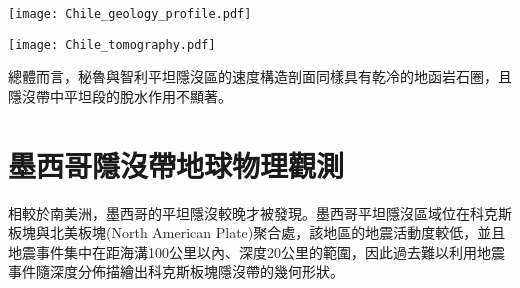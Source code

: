 \begin{figure*}[ht!]
    \centering
    \texttt{[image: Chile\_geology\_profile.pdf]}
    \caption[智利中部和阿根廷西部的地質構造與地震活動度背景圖，摘自\citet{Marot2014}]{智利中部和阿根廷西部的地質構造與地震活動度背景圖，摘自\citet{Marot2014}。(a)納茲卡板塊隱沒進入南美板塊的海溝由帶三角形的黑線標出。臨時地震網以倒三角形表示，地震分佈由灰點標出，紅色正三角形為活火山分佈，隱沒板塊等深度線資料來自\citet{anderson2007geometry}。白線為智利與阿根廷的國界，白色圈圈為主要城市，其中黑色星星為智利首都聖地牙哥(Santiago)。灰線與灰透明底為推斷的胡安斐南德斯洋脊隱沒路徑與寬度，插圖為宏觀地圖，兩條黑色虛線為該研究中所觀測的剖面，分別為南緯31.5度(平坦隱沒區)與南緯33.5度(正常隱沒區)。(b)粗黑線標示主要地質縫合帶，帶三角形的黑細線為La Ramada與Aconcagua斷層，白色圈圈為主要城市，紅色正三角形為活火山分佈。(c)(d)為圖(a)中的剖面，黑色點顯示平坦板塊與正常板塊區域的地震活動，倒黑色三角形是海溝位置，紅色三角形是活火山。
    }
    \label{fig::Chile_geology_profile}
\end{figure*}

\begin{figure*}[ht!]
    \centering
    \texttt{[image: Chile\_tomography.pdf]}
    \caption[智利中部和阿根廷西部的熱模型與速度構造剖面，摘自\citet{Marot2014}]{智利中部和阿根廷西部的熱模型與速度構造剖面，摘自\citet{Marot2014}。由上至下為熱構造剖面、V$_P$速度變化、V$_S$速度變化與V$_P$/V$_S$比值，速度構造剖面中的等高線為絕對地震速度。紅點代表該研究地震層析成像所選用的地震事件。白線為莫荷面，灰線為隱沒板塊頂部。(a)為圖\ref{fig::Chile_geology_profile}a中的C剖面。(b)為圖\ref{fig::Chile_geology_profile}a中的D剖面。
    }
    \label{fig::Chile_tomography}
\end{figure*}

總體而言，秘魯與智利平坦隱沒區的速度構造剖面同樣具有乾冷的地函岩石圈，且隱沒帶中平坦段的脫水作用不顯著。

\section{墨西哥隱沒帶地球物理觀測}\label{墨西哥隱沒帶地球物理觀測}
相較於南美洲，墨西哥的平坦隱沒較晚才被發現。墨西哥平坦隱沒區域位在科克斯板塊與北美板塊(North American Plate)聚合處，該地區的地震活動度較低，並且地震事件集中在距海溝100公里以內、深度20公里的範圍，因此過去難以利用地震事件隨深度分佈描繪出科克斯板塊隱沒帶的幾何形狀。

